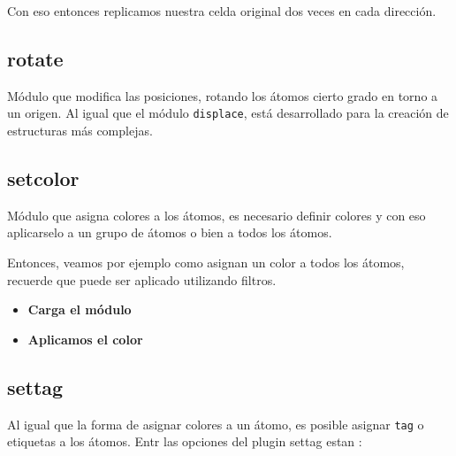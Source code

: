 Con eso entonces replicamos nuestra celda original dos veces en cada direcci\'on.


\subsection{rotate}
M\'odulo que modifica las posiciones, rotando los \'atomos cierto grado en torno a un origen. Al igual que el m\'odulo \verb|displace|, est\'a desarrollado para la creaci\'on de estructuras m\'as complejas.


\subsection{setcolor}
M\'odulo que asigna colores a los \'atomos, es necesario definir colores y con eso aplicarselo a un grupo de \'atomos o bien a todos los \'atomos. 


Entonces, veamos por ejemplo como asignan un color a todos los \'atomos, recuerde que puede ser aplicado utilizando filtros.

\begin{itemize}
 \item \textbf{Carga el m\'odulo}
 \item \textbf{Aplicamos el color}
\end{itemize}

\subsection{settag}
Al igual que la forma de asignar colores a un \'atomo, es posible asignar \verb|tag| o etiquetas a los \'atomos. Entr las opciones del plugin settag estan :

